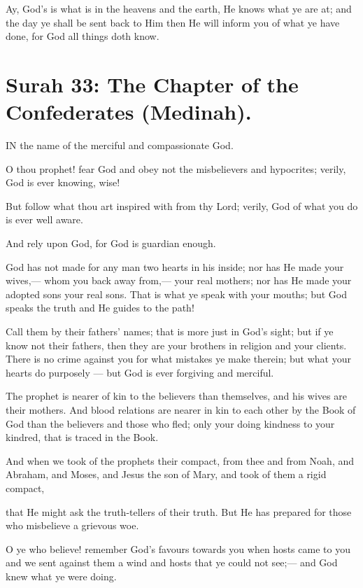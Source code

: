 \documentclass[fontsize=14pt, letterpaper, notitlepage, openany, DIV=12]{scrbook} %
\begin{document}
\noindent[24:64]
Ay, God's is what is in the heavens and the earth, He knows what ye are at; and the day
ye shall be sent back to Him then He will inform you of what ye have done, for God all things
doth know.


\section{Surah 33: The Chapter of the Confederates (Medinah).}


IN the name of the merciful and compassionate God.

\noindent[33:1]
O thou prophet! fear God and obey not the misbelievers and hypocrites; verily, God is
ever knowing, wise!

\noindent[33:2]
But follow what thou art inspired with from thy Lord; verily, God of what you do is ever
well aware.

\noindent[33:3]
And rely upon God, for God is guardian enough.

\noindent[33:4]
God has not made for any man two hearts in his inside; nor has He made your wives,---
whom you back away from,--- your real mothers; nor has He made your adopted sons your real
sons. That is what ye speak with your mouths; but God speaks the truth and He guides to the
path!

\noindent[33:5]
Call them by their fathers' names; that is more just in God's sight; but if ye know not
their fathers, then they are your brothers in religion and your clients. There is no crime against
you for what mistakes ye make therein; but what your hearts do purposely --- but God is ever
forgiving and merciful.

\noindent[33:6]
The prophet is nearer of kin to the believers than themselves, and his wives are their
mothers. And blood relations are nearer in kin to each other by the Book of God than the
believers and those who fled; only your doing kindness to your kindred, that is traced in the
Book.

\noindent[33:7]
And when we took of the prophets their compact, from thee and from Noah, and
Abraham, and Moses, and Jesus the son of Mary, and took of them a rigid compact,

\noindent[33:8]
that He might ask the truth-tellers of their truth. But He has prepared for those who
misbelieve a grievous woe.

\noindent[33:9]
O ye who believe! remember God's favours towards you when hosts came to you and we
sent against them a wind and hosts that ye could not see;--- and God knew what ye were doing.
\end{document}
